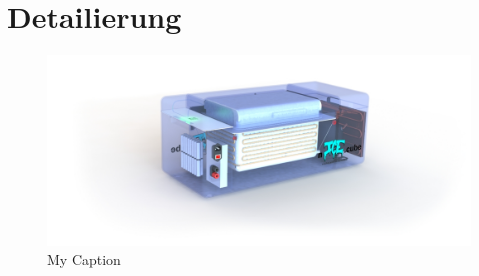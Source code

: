 \chapter{Detailierung}
\begin{figure}[h]
	\centering
	\includegraphics[width=\textwidth]{assets/transp6_edit.JPG}
	\caption{My Caption}
	\label{fig:transparent render}
\end{figure}